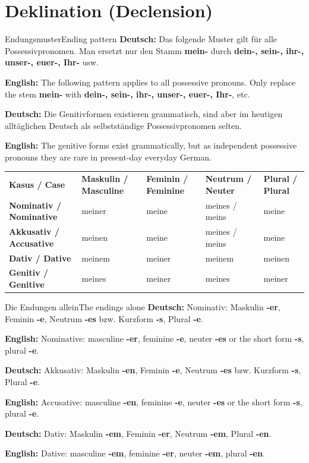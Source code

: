\documentclass[a4paper,11pt]{article}
\newcommand{\GermanText}[1]{\textbf{Deutsch: }#1\par}
\newcommand{\EnglishText}[1]{{\small\color{SoftGray}\textbf{English: }#1\par}}
\begin{document}
    \section{Deklination \textnormal{(Declension)}}

        \begin{grammarentry}{Endungsmuster}{Ending pattern}
            \GermanText{Das folgende Muster gilt für alle Possessivpronomen. Man ersetzt nur den Stamm \textbf{mein-} durch \textbf{dein-, sein-, ihr-, unser-, euer-, Ihr-} usw.}
            \EnglishText{The following pattern applies to all possessive pronouns. Only replace the stem \textbf{mein-} with \textbf{dein-, sein-, ihr-, unser-, euer-, Ihr-}, etc.}

            \GermanText{Die Genitivformen existieren grammatisch, sind aber im heutigen alltäglichen Deutsch als selbstständige Possessivpronomen selten.}
            \EnglishText{The genitive forms exist grammatically, but as independent possessive pronouns they are rare in present-day everyday German.}
        \end{grammarentry}

        \begin{longtable}{>{\bfseries}p{3.0cm}|p{2.9cm}|p{2.9cm}|p{2.9cm}|p{2.9cm}}
            \rowcolor{HeaderBlueDark}
            \color{white}\textbf{Kasus / Case} &
            \color{white}\textbf{Maskulin / Masculine} &
            \color{white}\textbf{Feminin / Feminine} &
            \color{white}\textbf{Neutrum / Neuter} &
            \color{white}\textbf{Plural / Plural} \\
            Nominativ / Nominative & meiner & meine & meines / meins & meine \\
            Akkusativ / Accusative & meinen & meine & meines / meins & meine \\
            Dativ / Dative & meinem & meiner & meinem & meinen \\
            Genitiv / Genitive & meines & meiner & meines & meiner \\
        \end{longtable}

        \begin{grammarentry}{Die Endungen allein}{The endings alone}
            \GermanText{Nominativ: Maskulin \textbf{-er}, Feminin \textbf{-e}, Neutrum \textbf{-es} bzw. Kurzform \textbf{-s}, Plural \textbf{-e}.}
            \EnglishText{Nominative: masculine \textbf{-er}, feminine \textbf{-e}, neuter \textbf{-es} or the short form \textbf{-s}, plural \textbf{-e}.}

            \GermanText{Akkusativ: Maskulin \textbf{-en}, Feminin \textbf{-e}, Neutrum \textbf{-es} bzw. Kurzform \textbf{-s}, Plural \textbf{-e}.}
            \EnglishText{Accusative: masculine \textbf{-en}, feminine \textbf{-e}, neuter \textbf{-es} or the short form \textbf{-s}, plural \textbf{-e}.}

            \GermanText{Dativ: Maskulin \textbf{-em}, Feminin \textbf{-er}, Neutrum \textbf{-em}, Plural \textbf{-en}.}
            \EnglishText{Dative: masculine \textbf{-em}, feminine \textbf{-er}, neuter \textbf{-em}, plural \textbf{-en}.}
        \end{grammarentry}
\end{document}
